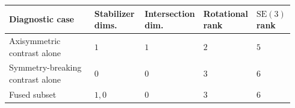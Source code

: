 \begin{tabular}{p{0.36\linewidth}p{0.18\linewidth}p{0.14\linewidth}p{0.14\linewidth}p{0.12\linewidth}}
\toprule
Diagnostic case & Stabilizer dims. & Intersection dim. & Rotational rank & $\mathrm{SE}(3)$ rank \\
\midrule
Axisymmetric contrast alone & $1$ & $1$ & $2$ & $5$ \\
Symmetry-breaking contrast alone & $0$ & $0$ & $3$ & $6$ \\
Fused subset & $1, 0$ & $0$ & $3$ & $6$ \\
\bottomrule
\end{tabular}
